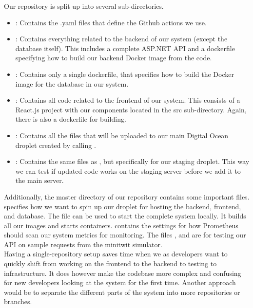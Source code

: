 Our repository is split up into several sub-directories.

\begin{itemize}
    \item {}: Contains the .yaml files that define the Github actions we use.
    \item {}: Contains everything related to the backend of our system (except the database itself). This includes a complete ASP.NET API and a dockerfile specifying how to build our backend Docker image from the code.
    \item {}: Contains only a single dockerfile, that specifies how to build the Docker image for the database in our system.
    \item {}: Contains all code related to the frontend of our system. This consists of a React.js project with our components located in the src sub-directory. Again, there is also a dockerfile for building.
    \item {}: Contains all the files that will be uploaded to our main Digital Ocean droplet created by calling .
    \item {}: Contains the same files as , but specifically for our staging droplet. This way we can test if updated code works on the staging server before we add it to the main server.
\end{itemize}

Additionally, the master directory of our repository contains some important files.  specifies how we want to spin up our droplet for hosting the backend, frontend, and database. The file  can be used to start the complete system locally. It builds all our images and starts containers.  contains the settings for how Prometheus should scan our system metrics for monitoring. The files , and  are for testing our API on sample requests from the minitwit simulator.\\

Having a single-repository setup saves time when we as developers want to quickly shift from working on the frontend to the backend to testing to infrastructure. It does however make the codebase more complex and confusing for new developers looking at the system for the first time. Another approach would be to separate the different parts of the system into more repositories or branches.


